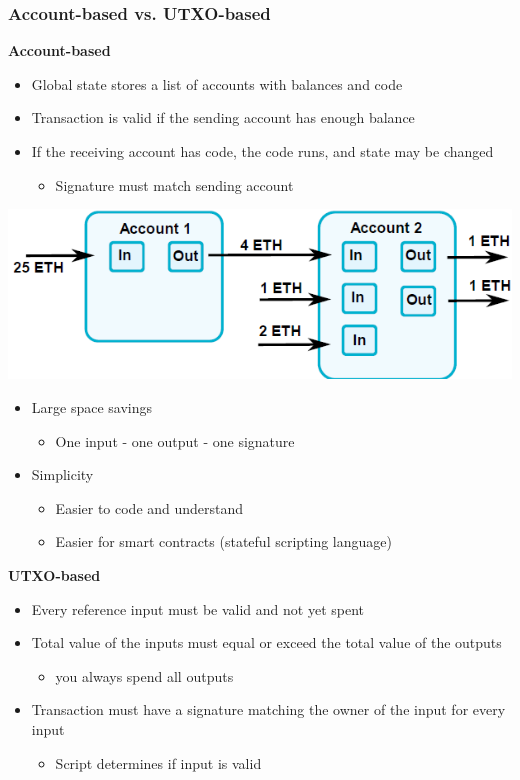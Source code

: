\subsubsection{Account-based vs. UTXO-based}
\textbf{Account-based}
\begin{itemize}
    \item Global state stores a list of accounts with balances and code
    \item Transaction is valid if the sending account has enough balance
    \item If the receiving account has code, the code runs, and state may be changed
    \begin{itemize}
        \item Signature must match sending account
    \end{itemize}
\end{itemize}
\includegraphics[width=0.6\linewidth]{../img/account-based.png}
\begin{itemize}
    \item Large space savings
    \begin{itemize}
        \item One input - one output - one signature
    \end{itemize}
    \item Simplicity
    \begin{itemize}
        \item Easier to code and understand
        \item Easier for smart contracts (stateful scripting language)
    \end{itemize}
\end{itemize}
\textbf{UTXO-based}
\begin{itemize}
    \item Every reference input must be valid and not yet spent
    \item Total value of the inputs must equal or exceed the total value of the outputs
    \begin{itemize}
        \item you always spend all outputs
    \end{itemize}
    \item Transaction must have a signature matching the owner of the input for every input
    \begin{itemize}
        \item Script determines if input is valid
    \end{itemize}
\end{itemize}
